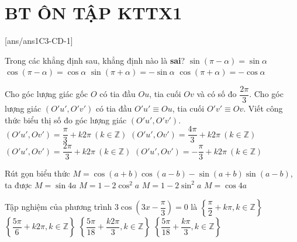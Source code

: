 \section*{BT ÔN TẬP KTTX1}
\setcounter{ex}{0}\setcounter{bt}{0}
[ans/ans1C3-CD-1]
\TN

\begin{ex}%
	Trong các khẳng định sau, khẳng định  nào là \textbf{sai}?
	\choice
	{$\sin(\pi-\alpha)=\sin\alpha$}
	{\True $\cos(\pi-\alpha)=\cos \alpha$}
	{$\sin(\pi+\alpha)=-\sin\alpha$}
	{$\cos(\pi+\alpha)=-\cos \alpha$}
\end{ex}

\begin{ex}%
	Cho góc lượng giác gốc $O$ có tia đầu $Ou$, tia cuối $Ov$ và có số đo $\dfrac{2\pi}{3}$. Cho góc lượng giác $(O'u',O'v')$ có tia đầu $O'u'\equiv Ou$, tia cuối $O'v'\equiv Ov$. Viết công thức biểu thị số đo góc lượng giác $(O'u',O'v')$.
	\choice
	{$(O'u',Ov')=\dfrac{\pi}{3}+k2\pi\ (k\in \mathbb{Z})$}
	{$(O'u',Ov')=\dfrac{4\pi}{3}+k2\pi\ (k\in \mathbb{Z})$}
	{\True $(O'u',Ov')=\dfrac{2\pi}{3}+k2\pi\ (k\in \mathbb{Z})$}
	{$(O'u',Ov')=-\dfrac{\pi}{3}+k2\pi\ (k\in \mathbb{Z})$}
\end{ex}

\begin{ex}%
	Rút gọn biểu thức $M=\cos(a+b)\cos(a-b)-\sin (a+b)\sin(a-b)$, ta được
	\choice
	{$M=\sin 4a$}
	{$M=1-2\cos^2a$}
	{\True $M=1-2\sin^2a$}
	{$M=\cos 4a$}
\end{ex}

\begin{ex}%
	Tập nghiệm của phương trình $3\cos\left(3x-\dfrac{\pi}{3}\right)=0$ là
	\choice
	{$\left\{\dfrac{\pi}{2}+k\pi, k \in \mathbb{Z}\right\}$}
	{$\left\{\dfrac{5\pi}{6}+k 2\pi, k \in \mathbb{Z}\right\}$}
	{$\left\{\dfrac{5\pi}{18}+\dfrac{k 2\pi}{3}, k \in \mathbb{Z}\right\}$}
	{\True $\left\{\dfrac{5\pi}{18}+\dfrac{k\pi}{3}, k \in \mathbb{Z}\right\}$}
\end{ex}

